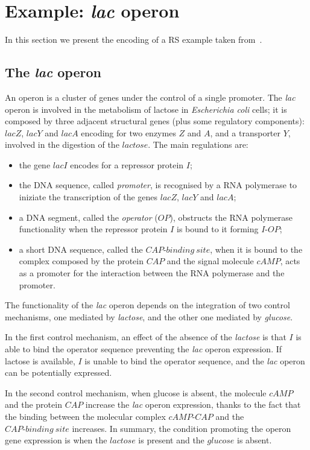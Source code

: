 \section{Example: \emph{lac} operon}
\label{ex:lactose}
In this section we present the encoding of a RS example
taken from~\cite{CMMBM12}.
\subsection{The \emph{lac} operon}
An operon is a cluster of genes under the control of a single promoter. 
The \emph{lac} operon  is involved in the metabolism of lactose in \emph{Escherichia coli} cells;
it is composed by three adjacent structural genes (plus some regulatory components):  $lacZ$, $lacY$ and $lacA$ encoding for two enzymes $Z$ and $A$, and a transporter $Y$, involved in the digestion of the $lactose$. The main regulations are:
\begin{itemize}
\item the gene $lacI$ encodes for a repressor protein $I$;
\item the DNA sequence, called \emph{promoter},  is recognised by a RNA polymerase
to iniziate the transcription  of the genes $lacZ$, $lacY$ and $lacA$;
\item a DNA segment, called  the \emph{operator} ($OP$),   obstructs the RNA polymerase functionality when  the repressor protein $I$ is bound to it forming $I\textrm{-}OP$;
\item  a short DNA sequence, called the $CAP\textrm{-}binding\ site$, when it is bound to the complex composed by  the protein $CAP$ and the signal molecule $cAMP$, acts as a promoter for the interaction between the RNA polymerase and the promoter.
\end{itemize}
The functionality of the \emph{lac} operon depends on the integration of two control mechanisms, one mediated by \emph{lactose}, and the other one mediated by \emph{glucose}. 

In the first control mechanism, an effect of the absence of the \emph{lactose} is that $I$ is able to bind the operator sequence preventing the \emph{lac} operon expression. If lactose is available, $I$ is unable to bind the operator sequence, and the \emph{lac} operon can be potentially expressed.

In  the second control mechanism, when glucose is absent, the molecule $cAMP$ and the protein $CAP$ increase the \emph{lac} operon expression, thanks to the fact that  the binding between the molecular complex $cAMP\textrm{-}CAP$ and the $CAP\textrm{-}binding\ site$ increases.
In summary, the condition promoting the operon
gene expression is when the $lactose$ is present and the $glucose$ is absent.

